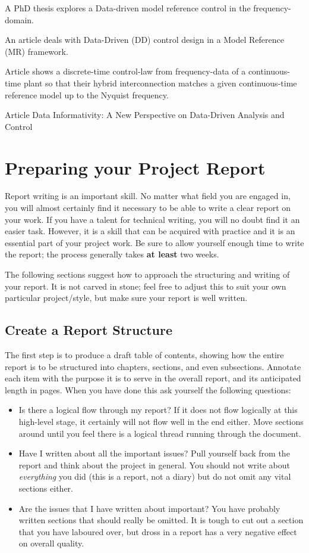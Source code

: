 \documentclass[]{final_report}
\begin{document}
A PhD thesis \cite{kergus} explores a Data-driven model reference control in the frequency-domain. 

An article \cite{CAMPESTRINI20172628} deals with Data-Driven (DD) control design in a Model Reference (MR) framework. 

Article \cite{vuillemin2019hybrid} shows a discrete-time control-law from frequency-data of a continuous-time plant so that their hybrid interconnection matches a given continuous-time reference model up to the Nyquist
frequency. 

Article \cite{Waarde2020} Data Informativity: A New Perspective on Data-Driven Analysis and Control

\chapter{Preparing your Project Report}

Report writing is an important skill. No matter what field you are engaged in, you will almost certainly find it necessary to be able to write a clear report on your work. If you have a talent for technical writing, you will no doubt find it an easier task. However, it is a skill that can be acquired with practice and it is an essential part of your project work. Be sure to allow yourself enough time to write the report; the process generally takes {\bf at least} two weeks. 

The following sections suggest how to approach the structuring and writing of your report. It is not carved in stone; feel free to adjust this to suit your own particular project/style, but make sure your report is well written.

\section{Create a Report Structure}

The first step is to produce a draft table of contents, showing how the entire report is to be structured into chapters, sections, and even subsections. Annotate each item with the purpose it is to serve in the overall report, and its anticipated length in pages. When you have done this ask yourself the following questions:

\begin{itemize}
\item Is there a logical flow through my report? If it does not flow logically at this high-level stage, it certainly will not flow well in the end either. Move sections around until you feel there is a logical thread running through the document.
\item Have I written about all the important issues? Pull yourself back from the report and think about the project in general. You should not write about {\sl everything} you did (this is a report, not a diary) but do not omit any vital sections either.
\item Are the issues that I have written about important? You have probably written sections that should really be omitted. It is tough to cut out a section that you have laboured over, but dross in a report has a very negative effect on overall quality.
\end{itemize}
\end{document}
